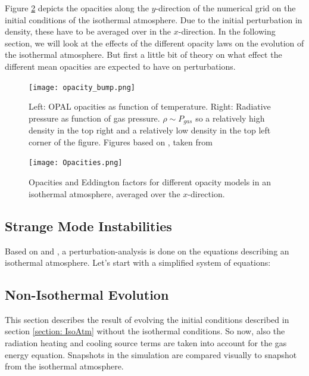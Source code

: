 Figure \ref{fig: op} depicts the opacities along the $y$-direction of the numerical grid on the initial conditions of the isothermal atmosphere. Due to the initial perturbation in density, these have to be averaged over in the $x$-direction. In the following section, we will look at the effects of the different opacity laws on the evolution of the isothermal atmosphere. But first a little bit of theory on what effect the different mean opacities  are expected to have on perturbations.



\begin{figure}
\texttt{[image: opacity\_bump.png]}
\caption{Left: OPAL opacities as function of temperature. Right: Radiative pressure as function of gas pressure. $\rho \sim P_{gas}$ so a relatively high density in the top right and a relatively low density in the top left corner of the figure. Figures based on \citep{Grevesse1993}, taken from \citep{Owocki2014}}
\label{fig: opacity_bump}
\end{figure}


\begin{figure}
\texttt{[image: Opacities.png]}
\caption{Opacities and Eddington factors for different opacity models in an isothermal atmosphere, averaged  over the $x$-direction.}
\label{fig: op}
\end{figure}


\subsection{Strange Mode Instabilities}
Based on \citep{Blaes2003} and \citep{Owocki2014}, a perturbation-analysis is done on the equations describing an isothermal atmosphere. Let's start with a simplified system of equations:


\subsection{Non-Isothermal Evolution}
This section describes the result of evolving the initial conditions described in section \ref{section: IsoAtm} without the isothermal conditions. So now, also the radiation heating and cooling source terms are taken into account for the gas energy equation. Snapshots in the simulation are compared visually to snapshot from the isothermal atmosphere.


